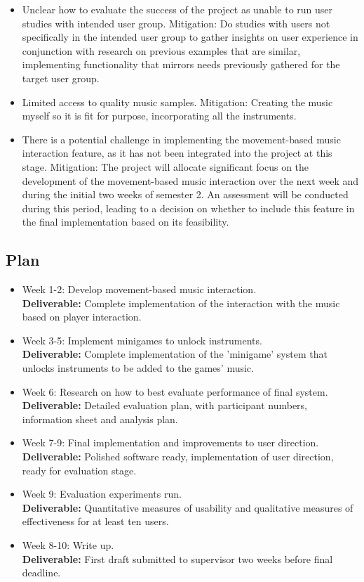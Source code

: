 \documentclass{article}
\begin{document}
\begin{itemize}
  \item Unclear how to evaluate the success of the project as unable to run user studies with intended user group. Mitigation: Do studies with users not specifically in the intended user group to gather insights on user experience in conjunction with research on previous examples that are similar, implementing functionality that mirrors needs previously gathered for the target user group.
  \item Limited access to quality music samples. Mitigation: Creating the music myself so it is fit for purpose, incorporating all the instruments.
  \item There is a potential challenge in implementing the movement-based music interaction feature, as it has not been integrated into the project at this stage. Mitigation: The project will allocate significant focus on the development of the movement-based music interaction over the next week and during the initial two weeks of semester 2. An assessment will be conducted during this period, leading to a decision on whether to include this feature in the final implementation based on its feasibility.
\end{itemize}

\subsection{Plan}

\begin{itemize}
  \item Week 1-2: Develop movement-based music interaction. \\
    \textbf{Deliverable:} Complete implementation of the interaction with the music based on player interaction.
  \item Week 3-5: Implement minigames to unlock instruments. \\
    \textbf{Deliverable:} Complete implementation of the 'minigame' system that unlocks instruments to be added to the games' music.
  \item Week 6: Research on how to best evaluate performance of final system. \\
    \textbf{Deliverable:} Detailed evaluation plan, with participant numbers, information sheet and analysis plan.
  \item Week 7-9: Final implementation and improvements to user direction. \\
    \textbf{Deliverable:} Polished software ready, implementation of user direction, ready for evaluation stage.
  \item Week 9: Evaluation experiments run. \\
    \textbf{Deliverable:} Quantitative measures of usability and qualitative measures of effectiveness for at least ten users.
  \item Week 8-10: Write up. \\
    \textbf{Deliverable:} First draft submitted to supervisor two weeks before final deadline.
\end{itemize}
\end{document}

